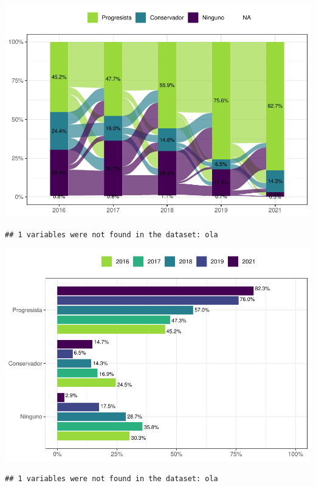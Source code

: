 \documentclass[
  12pt,
]{book}
\begin{document}
\begin{center}\includegraphics{reporte-elsoc_files/figure-latex/unnamed-chunk-8-1} \end{center}

\begin{verbatim}
## 1 variables were not found in the dataset: ola
\end{verbatim}

\begin{center}\includegraphics{reporte-elsoc_files/figure-latex/unnamed-chunk-9-1} \end{center}

\begin{verbatim}
## 1 variables were not found in the dataset: ola
\end{verbatim}
\end{document}
